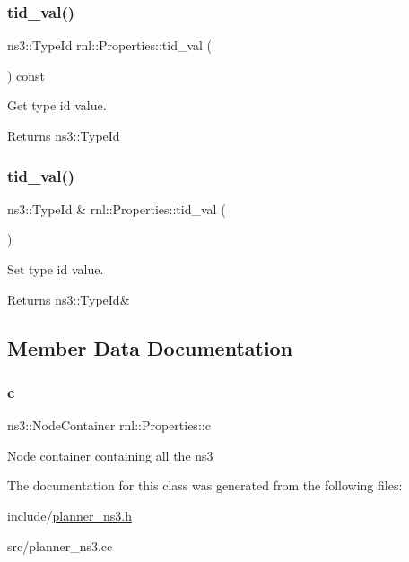 \subsubsection{\texorpdfstring{tid\+\_\+val()}{tid\_val()}\hspace{0.1cm}{\footnotesize\ttfamily [1/2]}}
{\footnotesize\ttfamily ns3\+::\+Type\+Id rnl\+::\+Properties\+::tid\+\_\+val (\begin{DoxyParamCaption}{ }\end{DoxyParamCaption}) const}



Get type id value. 

\begin{DoxyReturn}{Returns}
ns3\+::\+Type\+Id 
\end{DoxyReturn}
\mbox{\label{classrnl_1_1Properties_a2b715725840eadd5d40046a78a559803}} 
\subsubsection{\texorpdfstring{tid\+\_\+val()}{tid\_val()}\hspace{0.1cm}{\footnotesize\ttfamily [2/2]}}
{\footnotesize\ttfamily ns3\+::\+Type\+Id \& rnl\+::\+Properties\+::tid\+\_\+val (\begin{DoxyParamCaption}{ }\end{DoxyParamCaption})}



Set type id value. 

\begin{DoxyReturn}{Returns}
ns3\+::\+Type\+Id\& 
\end{DoxyReturn}


\subsection{Member Data Documentation}
\mbox{\label{classrnl_1_1Properties_ad0aa4a664efa0af4070bc63394395c1d}} 
\subsubsection{\texorpdfstring{c}{c}}
{\footnotesize\ttfamily ns3\+::\+Node\+Container rnl\+::\+Properties\+::c}

Node container containing all the ns3 

The documentation for this class was generated from the following files\+:\begin{DoxyCompactItemize}
\item 
include/\hyperlink{planner__ns3_8h}{planner\+\_\+ns3.\+h}\item 
src/planner\+\_\+ns3.\+cc\end{DoxyCompactItemize}
